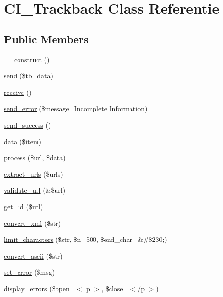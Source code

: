 \hypertarget{class_c_i___trackback}{}\section{C\+I\+\_\+\+Trackback Class Referentie}
\label{class_c_i___trackback}
\subsection*{Public Members}
\begin{DoxyCompactItemize}
\item 
\mbox{\hyperlink{class_c_i___trackback_a095c5d389db211932136b53f25f39685}{\+\_\+\+\_\+construct}} ()
\item 
\mbox{\hyperlink{class_c_i___trackback_a4ee54341ef16e67ca033704f4373a56b}{send}} (\$tb\+\_\+data)
\item 
\mbox{\hyperlink{class_c_i___trackback_ac805eb3a4eb25b19c1ab093023da4d35}{receive}} ()
\item 
\mbox{\hyperlink{class_c_i___trackback_a1d4188b1ba4d71ad5392bee635102e87}{send\+\_\+error}} (\$message=\textquotesingle{}Incomplete Information\textquotesingle{})
\item 
\mbox{\hyperlink{class_c_i___trackback_a57468453a4dc88340fdf12fb6e314248}{send\+\_\+success}} ()
\item 
\mbox{\hyperlink{class_c_i___trackback_a4d04a7a984a4bcc71e27be87706f393c}{data}} (\$item)
\item 
\mbox{\hyperlink{class_c_i___trackback_a7244ffd64e186d863812bb300fec8cdc}{process}} (\$url, \$\mbox{\hyperlink{class_c_i___trackback_a4d04a7a984a4bcc71e27be87706f393c}{data}})
\item 
\mbox{\hyperlink{class_c_i___trackback_aab29f333201544b83e318dd761ac797a}{extract\+\_\+urls}} (\$urls)
\item 
\mbox{\hyperlink{class_c_i___trackback_a5caa264fab6d2b2344e6bd5b298b08f2}{validate\+\_\+url}} (\&\$url)
\item 
\mbox{\hyperlink{class_c_i___trackback_a404e345e61e00d5685117a101b5bc71a}{get\+\_\+id}} (\$url)
\item 
\mbox{\hyperlink{class_c_i___trackback_a1ec67af2037561b65ffe49b59727cb53}{convert\+\_\+xml}} (\$str)
\item 
\mbox{\hyperlink{class_c_i___trackback_a55f0b98881441e99d74c657c3b005f11}{limit\+\_\+characters}} (\$str, \$n=500, \$end\+\_\+char=\textquotesingle{}\&\#8230;\textquotesingle{})
\item 
\mbox{\hyperlink{class_c_i___trackback_a0029bda7d34a222a5bda4ac894c31ac1}{convert\+\_\+ascii}} (\$str)
\item 
\mbox{\hyperlink{class_c_i___trackback_a892f1ba7cba3731a3fc68f1f64e92610}{set\+\_\+error}} (\$msg)
\item 
\mbox{\hyperlink{class_c_i___trackback_a71a6f2e6d97ff5347257f101002bc903}{display\+\_\+errors}} (\$open=\textquotesingle{}$<$ p $>$\textquotesingle{}, \$close=\textquotesingle{}$<$/p $>$\textquotesingle{})
\end{DoxyCompactItemize}
